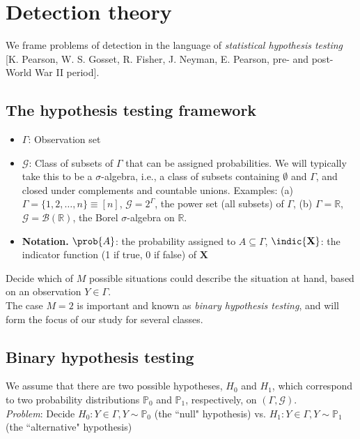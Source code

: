 \documentclass[12pt]{report}
\begin{document}
\section{Detection theory}

We frame problems of detection in the language of {\em statistical hypothesis testing} [K. Pearson, W. S. Gosset, R. Fisher, J. Neyman, E. Pearson, pre- and post- World War II period]. 

\subsection{The hypothesis testing framework}
\begin{itemize}
\item $\Gamma$: Observation set
\item $\mathcal{G}$: Class of subsets of $\Gamma$ that can be assigned probabilities. We will typically take this to be a $\sigma$-algebra, i.e., a class of subsets containing $\emptyset$ and $\Gamma$, and closed under complements and countable unions. Examples: (a) $\Gamma = \{1, 2, \ldots, n\} \equiv [n]$, $\mathcal{G} = 2^\Gamma$, the power set (all subsets) of $\Gamma$, (b) $\Gamma = \mathbb{R}$, $\mathcal{G} = \mathcal{B}(\mathbb{R})$, the Borel $\sigma$-algebra on $\mathbb{R}$.

\item {\bf Notation.} $\prob{A}$: the probability assigned to $A \subseteq \Gamma$, $\indic{\mathbf{X}}$: the indicator function (1 if true, 0 if false) of $\mathbf{X}$
\end{itemize}

 Decide which of $M$ possible situations could describe the situation at hand, based on an observation $Y \in \Gamma$. \\

The case $M = 2$ is important and known as {\em binary hypothesis testing}, and will form the focus of our study for several classes. 

\subsection{Binary hypothesis testing}
We assume that there are two possible hypotheses, $H_0$ and $H_1$, which correspond to two probability distributions $\mathbb{P}_0$ and $\mathbb{P}_1$, respectively, on $(\Gamma, \mathcal{G})$. \\

{\em Problem}: Decide \noindent $H_0: Y \in \Gamma, Y \sim \mathbb{P}_0$ (the ``null" hypothesis) vs. \noindent $H_1: Y \in \Gamma, Y \sim \mathbb{P}_1$ (the ``alternative" hypothesis)
\end{document}
